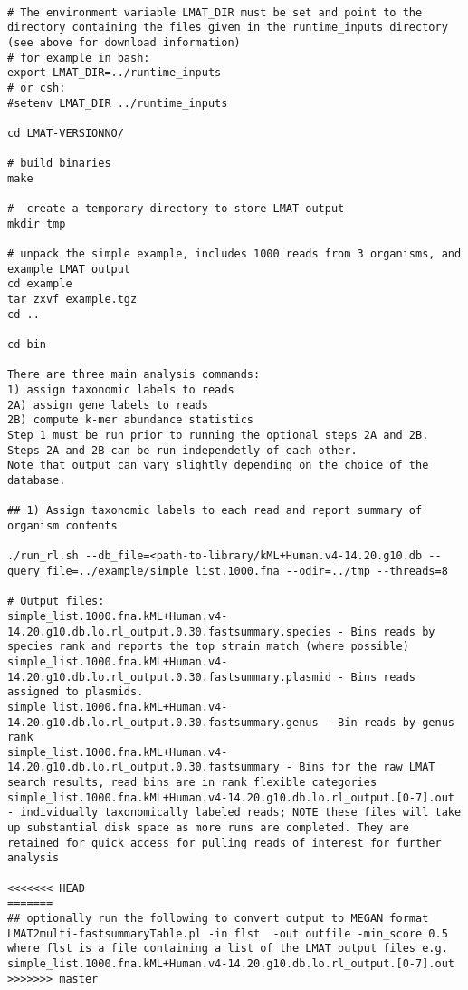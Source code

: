 \documentclass[11pt]{article}
\begin{document}
\begin{verbatim}

# The environment variable LMAT_DIR must be set and point to the directory containing the files given in the runtime_inputs directory (see above for download information)
# for example in bash:
export LMAT_DIR=../runtime_inputs
# or csh:
#setenv LMAT_DIR ../runtime_inputs

cd LMAT-VERSIONNO/

# build binaries
make

#  create a temporary directory to store LMAT output
mkdir tmp

# unpack the simple example, includes 1000 reads from 3 organisms, and example LMAT output
cd example
tar zxvf example.tgz
cd ..

cd bin

There are three main analysis commands: 
1) assign taxonomic labels to reads
2A) assign gene labels to reads
2B) compute k-mer abundance statistics
Step 1 must be run prior to running the optional steps 2A and 2B. Steps 2A and 2B can be run independetly of each other.
Note that output can vary slightly depending on the choice of the database.

## 1) Assign taxonomic labels to each read and report summary of organism contents

./run_rl.sh --db_file=<path-to-library/kML+Human.v4-14.20.g10.db --query_file=../example/simple_list.1000.fna --odir=../tmp --threads=8

# Output files:
simple_list.1000.fna.kML+Human.v4-14.20.g10.db.lo.rl_output.0.30.fastsummary.species - Bins reads by species rank and reports the top strain match (where possible)
simple_list.1000.fna.kML+Human.v4-14.20.g10.db.lo.rl_output.0.30.fastsummary.plasmid - Bins reads assigned to plasmids.
simple_list.1000.fna.kML+Human.v4-14.20.g10.db.lo.rl_output.0.30.fastsummary.genus - Bin reads by genus rank
simple_list.1000.fna.kML+Human.v4-14.20.g10.db.lo.rl_output.0.30.fastsummary - Bins for the raw LMAT search results, read bins are in rank flexible categories
simple_list.1000.fna.kML+Human.v4-14.20.g10.db.lo.rl_output.[0-7].out - individually taxonomically labeled reads; NOTE these files will take up substantial disk space as more runs are completed. They are retained for quick access for pulling reads of interest for further analysis 

<<<<<<< HEAD
=======
## optionally run the following to convert output to MEGAN format
LMAT2multi-fastsummaryTable.pl -in flst  -out outfile -min_score 0.5
where flst is a file containing a list of the LMAT output files e.g. simple_list.1000.fna.kML+Human.v4-14.20.g10.db.lo.rl_output.[0-7].out
>>>>>>> master


\end{verbatim}
\end{document}
